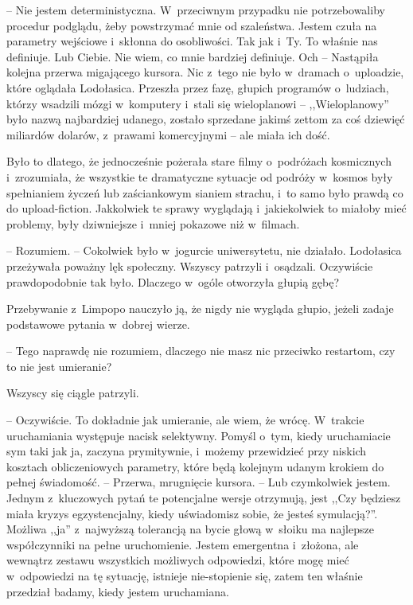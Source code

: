 \documentclass[oneside,polish,11pt,sfheadings]{mwbk}
\begin{document}
-- Nie jestem deterministyczna. W~przeciwnym przypadku nie potrzebowaliby
procedur podglądu, żeby powstrzymać mnie od szaleństwa. Jestem czuła na
parametry wejściowe i~skłonna do osobliwości. Tak jak i~Ty. To właśnie
nas definiuje. Lub Ciebie. Nie wiem, co mnie bardziej definiuje. Och -- Nastąpiła kolejna przerwa migającego kursora. Nic z~tego nie było w~dramach o~uploadzie, które oglądała Lodołasica. Przeszła przez fazę,
głupich programów o~ludziach, którzy wsadzili mózgi w~komputery i~stali
się wieloplanowi -- ,,Wieloplanowy'' było nazwą najbardziej udanego,
zostało sprzedane jakimś zettom za coś dziewięć miliardów dolarów, z~prawami komercyjnymi -- ale miała ich dość.

Było to dlatego, że jednocześnie pożerała stare filmy o~podróżach
kosmicznych i~zrozumiała, że wszystkie te dramatyczne sytuacje od
podróży w~kosmos były spełnianiem życzeń lub zaściankowym sianiem
strachu, i~to samo było prawdą co do upload-fiction. Jakkolwiek te
sprawy wyglądają i~jakiekolwiek to miałoby mieć problemy, były
dziwniejsze i~mniej pokazowe niż w~filmach.

-- Rozumiem. -- Cokolwiek było w~jogurcie uniwersytetu, nie działało.
Lodołasica przeżywała poważny lęk społeczny. Wszyscy patrzyli i~osądzali. Oczywiście prawdopodobnie tak było. Dlaczego w~ogóle otworzyła
głupią gębę?

Przebywanie z~Limpopo nauczyło ją, że nigdy nie wygląda głupio, jeżeli
zadaje podstawowe pytania w~dobrej wierze. 

-- Tego naprawdę nie rozumiem,
dlaczego nie masz nic przeciwko restartom, czy to nie jest umieranie?

Wszyscy się ciągle patrzyli. 

-- Oczywiście. To dokładnie jak umieranie,
ale wiem, że wrócę. W~trakcie uruchamiania występuje nacisk selektywny.
Pomyśl o~tym, kiedy uruchamiacie sym taki jak ja, zaczyna prymitywnie, i~możemy przewidzieć przy niskich kosztach obliczeniowych parametry, które
będą kolejnym udanym krokiem do pełnej świadomość. -- Przerwa, mrugnięcie
kursora. -- Lub czymkolwiek jestem. Jednym z~kluczowych pytań te
potencjalne wersje otrzymują, jest ,,Czy będziesz miała kryzys
egzystencjalny, kiedy uświadomisz sobie, że jesteś symulacją?''. Możliwa
,,ja'' z~najwyższą tolerancją na bycie głową w~słoiku ma najlepsze
współczynniki na pełne uruchomienie. Jestem emergentna i~złożona, ale
wewnątrz zestawu wszystkich możliwych odpowiedzi, które mogę mieć w~odpowiedzi na tę sytuację, istnieje nie-stopienie się, zatem ten właśnie
przedział badamy, kiedy jestem uruchamiana.
\end{document}
